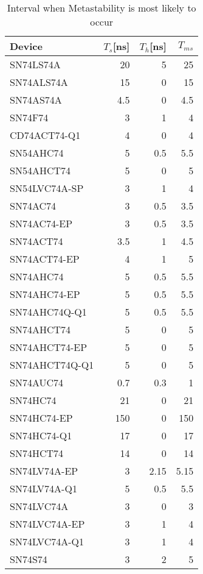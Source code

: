 \begin{table}
\caption{Interval when Metastability is most likely to occur}\label{tab:metastabilitytimes7474}
\begin{tabular}{lrrr}
Device   & $T_s$[ns] & $T_h$[ns] & $T_{ms}$ \\\hline
SN74LS74A        &	20   &	5    &	25\\
SN74ALS74A       &	15   &	0    &	15\\
SN74AS74A        &	4.5  &	0    &	4.5\\
SN74F74          &	3    &	1    &	4\\
CD74ACT74-Q1     &	4    &	0    &	4\\
SN54AHC74        &	5    &	0.5  &	5.5\\
SN54AHCT74       &	5    &	0    &	5\\
SN54LVC74A-SP    &	3    &	1    &	4\\
SN74AC74         &	3    &	0.5  &	3.5\\
SN74AC74-EP      &	3    &	0.5  &	3.5\\
SN74ACT74        &	3.5  &	1    &	4.5\\
SN74ACT74-EP     &	4    &	1    &	5\\
SN74AHC74        &	5    &	0.5  &	5.5\\
SN74AHC74-EP     &	5    &	0.5  &	5.5\\
SN74AHC74Q-Q1    &	5    &	0.5  &	5.5\\
SN74AHCT74       &	5    &	0    &	5\\
SN74AHCT74-EP    &	5    &	0    &	5\\
SN74AHCT74Q-Q1   &	5    &	0    &	5\\
SN74AUC74        &	0.7  &	0.3  &	1\\
SN74HC74         &	21   &	0    &	21\\
SN74HC74-EP      &	150  &	0    &	150\\
SN74HC74-Q1      &	17   &	0    &	17\\
SN74HCT74        &	14   &	0    &	14\\
SN74LV74A-EP     &	3    &	2.15 &	5.15\\
SN74LV74A-Q1     &	5    &	0.5  &	5.5\\
SN74LVC74A       &	3    &	0    &	3\\
SN74LVC74A-EP    &	3    &	1    &	4\\
SN74LVC74A-Q1    &	3    &	1    &	4\\
SN74S74          &	3    &	2    &	5\\
\end{tabular}
\end{table}




